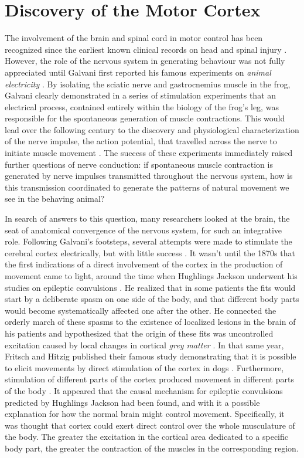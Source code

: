\section{Discovery of the Motor Cortex}

The involvement of the brain and spinal cord in motor control has been recognized since the earliest known clinical records on head and spinal injury \cite{Louis1994,VanMiddendorp2010}. However, the role of the nervous system in generating behaviour was not fully appreciated until Galvani first reported his famous experiments on \textit{animal electricity} \cite{Galvani1791}. By isolating the sciatic nerve and gastrocnemius muscle in the frog, Galvani clearly demonstrated in a series of stimulation experiments that an electrical process, contained entirely within the biology of the frog's leg, was responsible for the spontaneous generation of muscle contractions. This would lead over the following century to the discovery and physiological characterization of the nerve impulse, the action potential, that travelled across the nerve to initiate muscle movement \cite{DuBois-Reymond1843,Bernstein1868,Schuetze1983}. The success of these experiments immediately raised further questions of nerve conduction: if spontaneous muscle contraction is generated by nerve impulses transmitted throughout the nervous system, how is this transmission coordinated to generate the patterns of natural movement we see in the behaving animal?

In search of answers to this question, many researchers looked at the brain, the seat of anatomical convergence of the nervous system, for such an integrative role. Following Galvani's footsteps, several attempts were made to stimulate the cerebral cortex electrically, but with little success \cite{Gross2007}. It wasn't until the 1870s that the first indications of a direct involvement of the cortex in the production of movement came to light, around the time when Hughlings Jackson underwent his studies on epileptic convulsions \cite{Jackson1870}. He realized that in some patients the fits would start by a deliberate spasm on one side of the body, and that different body parts would become systematically affected one after the other. He connected the orderly march of these spasms to the existence of localized lesions in the brain of his patients and hypothesized that the origin of these fits was uncontrolled excitation caused by local changes in cortical \emph{grey matter} \cite{Jackson1870}. In that same year, Fritsch and Hitzig published their famous study demonstrating that it is possible to elicit movements by direct stimulation of the cortex in dogs \cite{Fritsch1870}. Furthermore, stimulation of different parts of the cortex produced movement in different parts of the body \cite{Fritsch1870}. It appeared that the causal mechanism for epileptic convulsions predicted by Hughlings Jackson had been found, and with it a possible explanation for how the normal brain might control movement. Specifically, it was thought that cortex could exert direct control over the whole musculature of the body. The greater the excitation in the cortical area dedicated to a specific body part, the greater the contraction of the muscles in the corresponding region.


